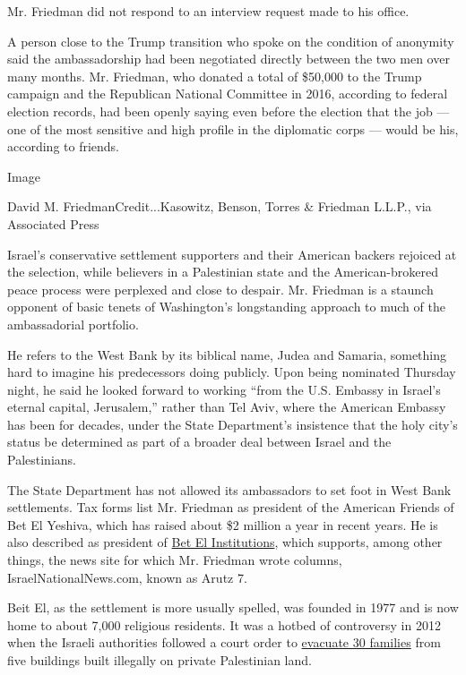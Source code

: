 Mr. Friedman did not respond to an interview request made to his office.

A person close to the Trump transition who spoke on the condition of
anonymity said the ambassadorship had been negotiated directly between
the two men over many months. Mr. Friedman, who donated a total of
\$50,000 to the Trump campaign and the Republican National Committee in
2016, according to federal election records, had been openly saying even
before the election that the job --- one of the most sensitive and high
profile in the diplomatic corps --- would be his, according to friends.

Image

David M. FriedmanCredit...Kasowitz, Benson, Torres \& Friedman L.L.P.,
via Associated Press

Israel's conservative settlement supporters and their American backers
rejoiced at the selection, while believers in a Palestinian state and
the American-brokered peace process were perplexed and close to despair.
Mr. Friedman is a staunch opponent of basic tenets of Washington's
longstanding approach to much of the ambassadorial portfolio.

He refers to the West Bank by its biblical name, Judea and Samaria,
something hard to imagine his predecessors doing publicly. Upon being
nominated Thursday night, he said he looked forward to working ``from
the U.S. Embassy in Israel's eternal capital, Jerusalem,'' rather than
Tel Aviv, where the American Embassy has been for decades, under the
State Department's insistence that the holy city's status be determined
as part of a broader deal between Israel and the Palestinians.

The State Department has not allowed its ambassadors to set foot in West
Bank settlements. Tax forms list Mr. Friedman as president of the
American Friends of Bet El Yeshiva, which has raised about \$2 million a
year in recent years. He is also described as president of
\href{http://betelinstitutions.com/2016-dinner-reservations/}{Bet El
Institutions}, which supports, among other things, the news site for
which Mr. Friedman wrote columns, IsraelNationalNews.com, known as Arutz
7.

Beit El, as the settlement is more usually spelled, was founded in 1977
and is now home to about 7,000 religious residents. It was a hotbed of
controversy in 2012 when the Israeli authorities followed a court order
to
\href{http://www.nytimes3xbfgragh.onion/2012/06/27/world/middleeast/jewish-settlers-begin-evacuation-of-ulpana.html}{evacuate
30 families} from five buildings built illegally on private Palestinian
land.

